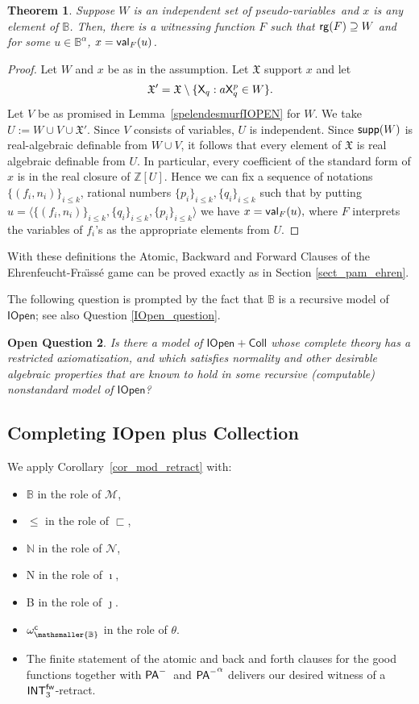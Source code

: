 \documentclass{amsart}
\newcommand{\qee} {\hspace*{2mm}\hfill \ding{109}}
\renewcommand{\leq}{\leqslant}
\newtheorem{theorem}{Theorem}[section]
\newtheorem{ques}[theorem]{Open Question}
\newenvironment{question}{\begin{ques} \rm}{\qee\end{ques}}
\newcommand{\mc}[1]{\mathcal #1}
\newcommand{\tupel}[1]{{\langle #1 \rangle}}
\newcommand{\pam}{\ensuremath{{\sf PA}^{-}}}
\newcommand{\belowz}{\sqsubset}
\newcommand{\X}{{\sf X}}
\newcommand{\mbbs}[1]{\ensuremath{\mathsmaller{\mathbb{#1}}}}
\newcommand{\psvar}{pseudo-variables}
\begin{document}
 \begin{theorem}\label{thm_extension lemma_IOP}
Suppose $W$ is an independent set of \psvar\ and $x$ is any element of $\mathbb{B}$. Then, there is a witnessing function $F$ such that ${\sf rg}(F)\supseteq W$ and for some $u\in\mathbb{B}^{\alpha}$, $x= {\sf val}_F(u)$.
\end{theorem}
\begin{proof}
    Let  $W$ and $x$ be as in the assumption. Let $\mathfrak{X}$ support $x$ and let $$\mathfrak{X}' = \mathfrak{X}\setminus \{\X_q : a\X_q^p\in W\}.$$ Let $V$ be as promised in Lemma~\ref{spelendesmurfIOPEN} for $W$. 
We take $U := W \cup V \cup \mathfrak{X}'$.  Since $V$ consists of variables,
$U$ is independent. Since ${\sf supp}(W)$ is real-algebraic definable from $W\cup V$,
 it follows that every element of $\mathfrak{X}$ is real algebraic definable from $U$. In particular, every coefficient of the standard form of $x$ is in the real closure of $\mathbb{Z}[U]$. Hence we can fix a sequence of notations $\{(f_i,n_i)\}_{i\leq k}$, rational numbers $\{p_i\}_{i\leq k}, \{q_i\}_{i\leq k}$ such that by putting $u = \tupel{\{(f_i,n_i)\}_{i\leq k}, \{q_i\}_{i\leq k}, \{p_i\}_{i\leq k}}$ we have $x = {\sf val}_F(u),$ where $F$ interprets the variables of $f_i$'s as the appropriate elements from $U$. 
\end{proof}

  With these definitions the Atomic, Backward and Forward Clauses of the Ehrenfeucht-Fra\"{\i}ss\'{e} game can be proved exactly as in Section \ref{sect_pam_ehren}. 
  
  The following question is prompted by the fact that $\mathbb{B}$ is a recursive model of $\mathsf{IOpen}$; see also Question \ref{IOpen_question}.
  \begin{question} \label{last_question}Is there a model of $\mathsf{IOpen + Coll}$ whose complete theory has a restricted axiomatization, and which satisfies normality and other desirable algebraic properties that are known to hold in some recursive (computable) nonstandard model of $\mathsf{IOpen}$?   
  \end{question}

\subsection{Completing {\sf IOpen} plus Collection}
We  apply Corollary~\ref{cor_mod_retract} with:
\begin{itemize}
    \item 
$\mathbb B$ in the role of $\mc M$, 
\item 
$\leq$ in the role of $\belowz$, 
\item 
$\mathbb N$ in the role of
$\mc N$, 
\item 
{\sf N} in the role of $\imath$,
\item 
{\sf B} in the role of $\jmath$. 
\item
$\omega_{\mbbs B}^{\sf c}$ in the role of $\theta$.
\item 
The finite statement of the atomic and back and forth clauses
for the good functions together with \pam\ and ${\pam}^\alpha$ delivers 
our desired witness of a ${\sf INT}^{\sf fw}_3$-retract.
\end{itemize}
\end{document}
